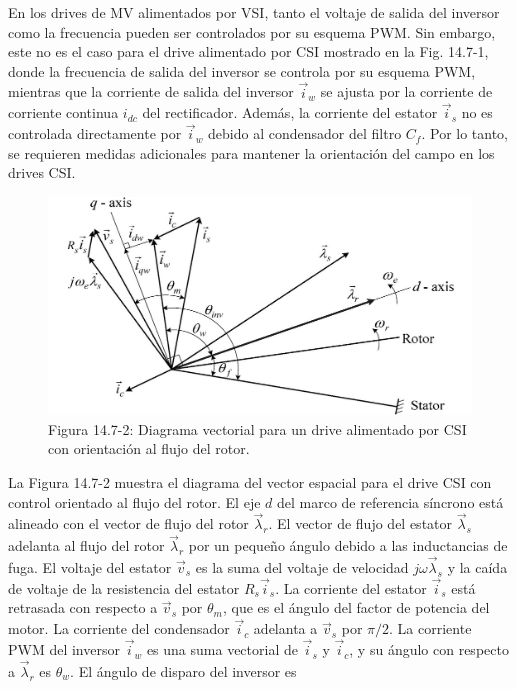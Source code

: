 \documentclass[letterpaper,12pt]{article}
\begin{document}
En los drives de MV alimentados por VSI, tanto el voltaje de salida del inversor como la frecuencia pueden ser controlados por su esquema PWM. Sin embargo, este no es el caso para el drive alimentado por CSI mostrado en la Fig. 14.7-1, donde la frecuencia de salida del inversor se controla por su esquema PWM, mientras que la corriente de salida del inversor $\vec{i}_w$ se ajusta por la corriente de corriente continua $i_{dc}$ del rectificador. Además, la corriente del estator $\vec{i}_s$ no es controlada directamente por $\vec{i}_w$ debido al condensador del filtro $C_f$. Por lo tanto, se requieren medidas adicionales para mantener la orientación del campo en los drives CSI.

\begin{figure}[ht]
\centering
\includegraphics{graficos/img21.jpg}
\caption{Figura 14.7-2: Diagrama vectorial para un drive alimentado por CSI con orientación al flujo del rotor.}
\end{figure}
\FloatBarrier

La Figura 14.7-2 muestra el diagrama del vector espacial para el drive CSI con control orientado al flujo del rotor. El eje $d$ del marco de referencia síncrono está alineado con el vector de flujo del rotor $\vec{\lambda}_r$. El vector de flujo del estator $\vec{\lambda}_s$ adelanta al flujo del rotor $\vec{\lambda}_r$ por un pequeño ángulo debido a las inductancias de fuga. El voltaje del estator $\vec{v}_s$ es la suma del voltaje de velocidad $j\omega \vec{\lambda}_s$ y la caída de voltaje de la resistencia del estator $R_s \vec{i}_s$. La corriente del estator $\vec{i}_s$ está retrasada con respecto a $\vec{v}_s$ por $\theta_{m}$, que es el ángulo del factor de potencia del motor. La corriente del condensador $\vec{i}_c$ adelanta a $\vec{v}_s$ por $\pi/2$. La corriente PWM del inversor $\vec{i}_w$ es una suma vectorial de $\vec{i}_s$ y $\vec{i}_c$, y su ángulo con respecto a $\vec{\lambda}_r$ es $\theta_{w}$. El ángulo de disparo del inversor es
\end{document}
